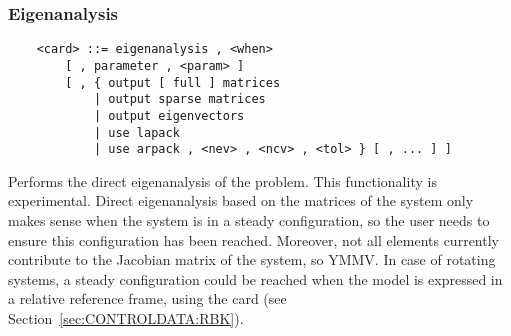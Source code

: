 \subsubsection{Eigenanalysis}
\label{sec:IVP:eigenanalysis}
\begin{verbatim}
    <card> ::= eigenanalysis , <when>
        [ , parameter , <param> ]
        [ , { output [ full ] matrices
            | output sparse matrices
            | output eigenvectors
            | use lapack
            | use arpack , <nev> , <ncv> , <tol> } [ , ... ] ]
\end{verbatim}
Performs the direct eigenanalysis of the problem.
This functionality is experimental.
Direct eigenanalysis based on the matrices of the system
only makes sense when the system is in a steady configuration,
so the user needs to ensure this configuration has been reached.
Moreover, not all elements currently contribute to the Jacobian
matrix of the system, so YMMV.
In case of rotating systems, a steady configuration could be reached
when the model is expressed in a relative reference frame,
using the  card
(see Section~\ref{sec:CONTROLDATA:RBK}).


